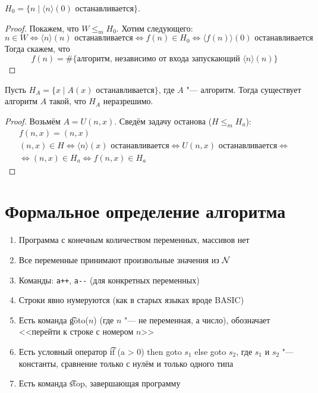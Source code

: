 \begin{exmp}
	$H_0 = \{n \mid \langle n \rangle(0)\text{~останавливается} \}$.
\end{exmp}
\begin{proof}
	Покажем, что $W \le_m H_0$.
	Хотим следующего:
	\[ n \in W \iff \langle n \rangle(n)\text{~останавливается} \iff f(n) \in H_0 \iff \langle f(n) \rangle (0)\text{~останавливается} \]
	Тогда скажем, что
	\[ f(n) = \#\{\text{алгоритм, независимо от входа запускающий~}\langle n \rangle(n) \} \]
\end{proof}

\begin{exmp}
	Пусть $H_A = \{x \mid A(x)\text{~останавливается}\}$, где $A$ "--- алгоритм.
	Тогда существует алгоритм $A$ такой, что $H_A$ неразрешимо.
\end{exmp}
\begin{proof}
	Возьмём $A = U(n, x)$.
	Сведём задачу останова ($H \le_m H_a$):
	\begin{gather*}
		f(n, x) = (n, x) \\
		(n, x) \in H \iff \langle n \rangle (x)\text{~останавливается}\iff U(n, x)\text{~останавливается} \iff \\
		\iff (n, x) \in H_a \iff f(n, x) \in H_a
	\end{gather*}
\end{proof}

\section{Формальное определение алгоритма}
\begin{enumerate}
	\item Программа с конечным количеством переменных, массивов нет
	\item Все переменные принимают произвольные значения из $\mathcal{N}$
	\item Команды: \verb'a++', \verb'a--' (для конкретных переменных)
	\item Строки явно нумеруются (как в старых языках вроде BASIC)
	\item Есть команда \t{goto($n$)} (где $n$ "--- не переменная, а число), обозначает <<перейти к строке с номером $n$>>
	\item Есть условный оператор \t{if (a > 0) then goto $s_1$ else goto $s_2$}, где $s_1$ и $s_2$ "--- константы, сравнение только с нулём и только одного типа
	\item Есть команда \t{stop}, завершающая программу
\end{enumerate}


